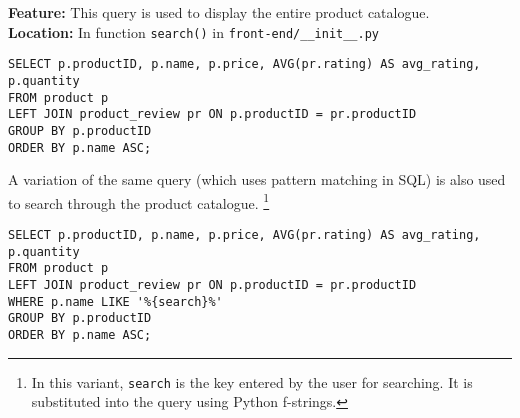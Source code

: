 \textbf{Feature:} This query is used to display the entire product catalogue. \\
\textbf{Location:} In function \texttt{search()} in \texttt{front-end/\_\_init\_\_.py}

\begin{lstlisting}
SELECT p.productID, p.name, p.price, AVG(pr.rating) AS avg_rating, p.quantity
FROM product p
LEFT JOIN product_review pr ON p.productID = pr.productID
GROUP BY p.productID
ORDER BY p.name ASC;
\end{lstlisting}

A variation of the same query (which uses pattern matching in SQL) is also used to search through the product catalogue.
\footnote{
    In this variant, \texttt{search} is the key entered by the user for searching.
    It is substituted into the query using Python f-strings.
}

\begin{lstlisting}
SELECT p.productID, p.name, p.price, AVG(pr.rating) AS avg_rating, p.quantity
FROM product p
LEFT JOIN product_review pr ON p.productID = pr.productID
WHERE p.name LIKE '%{search}%'
GROUP BY p.productID
ORDER BY p.name ASC;
\end{lstlisting}